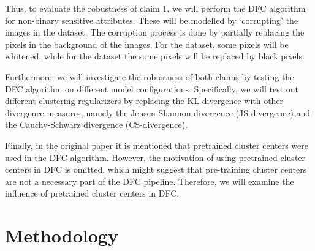 Thus, to evaluate the robustness of claim 1, we will perform the DFC algorithm for non-binary sensitive attributes. These will be modelled by `corrupting' the images in the \revMNIST dataset. The corruption process is done by partially replacing the pixels in the background of the images. For the \mn dataset, some pixels will be whitened, while for the \revMNIST dataset the some pixels will be replaced by black pixels.

Furthermore, we will investigate the robustness of both claims by testing the DFC algorithm on different model configurations. Specifically, we will test out different clustering regularizers by replacing the KL-divergence with other divergence measures, namely the Jensen-Shannon divergence (JS-divergence) and the Cauchy-Schwarz divergence (CS-divergence).

Finally, in the original paper it is mentioned that pretrained cluster centers were used in the DFC algorithm. However, the motivation of using pretrained cluster centers in DFC is omitted, which might suggest that pre-training cluster centers are not a necessary part of the DFC pipeline. Therefore, we will examine the influence of pretrained cluster centers in DFC.



\section{Methodology}

